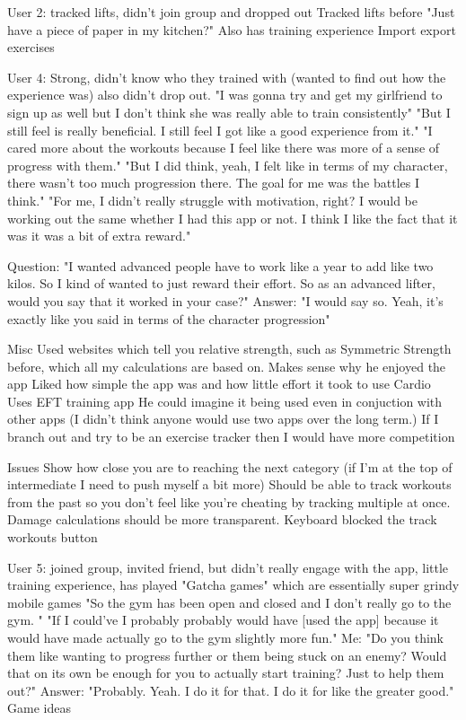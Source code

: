 \documentclass{l4proj}
\begin{document}
    

User 2: tracked lifts, didn't join group and dropped out
  Tracked lifts before "Just have a piece of paper in my kitchen?" Also has training experience
  Import export exercises
  





User 4: Strong, didn't know who they trained with (wanted to find out how the experience was) also didn't drop out. 
  "I was gonna try and get my girlfriend to sign up as well but I don't think she was really able to train consistently"
  "But I still feel is really beneficial. I still feel I got like a good experience from it."
  "I cared more about the workouts because I feel like there was more of a sense of progress with them."
  "But I did think, yeah, I felt like in terms of my character, there wasn't too much progression there. The goal for me was the battles I think." 
  "For me, I didn't really struggle with motivation, right? I would be working out the same whether I had this app or not. I think I like the fact that it was it was a bit of extra reward."

  Question: "I wanted advanced people have to work like a year to add like two kilos. So I kind of wanted to just reward their effort. So as an advanced lifter, would you say that it worked in your case?"
    Answer: "I would say so. Yeah, it's exactly like you said in terms of the character progression"

  Misc
    Used websites which tell you relative strength, such as Symmetric Strength before, which all my calculations are based on. Makes sense why he enjoyed the app
    Liked how simple the app was and how little effort it took to use
    Cardio 
    Uses EFT training app
    He could imagine it being used even in conjuction with other apps (I didn't think anyone would use two apps over the long term.)
    If I branch out and try to be an exercise tracker then I would have more competition

  Issues
    Show how close you are to reaching the next category (if I'm at the top of intermediate I need to push myself a bit more)
    Should be able to track workouts from the past so you don't feel like you're cheating by tracking multiple at once.
    Damage calculations should be more transparent.
    Keyboard blocked the track workouts button

User 5: joined group, invited friend, but didn't really engage with the app, little training experience, has played "Gatcha games" which are essentially super grindy mobile games
 "So the gym has been open and closed and I don't really go to the gym. "
 "If I could've I probably probably would have [used the app] because it would have made actually go to the gym slightly more fun."
  Me: "Do you think them like wanting to progress further or them being stuck on an enemy? Would that on its own be enough for you to actually start training? Just to help them out?"
    Answer: "Probably. Yeah. I do it for that. I do it for like the greater good."
   Game ideas
\end{document}
